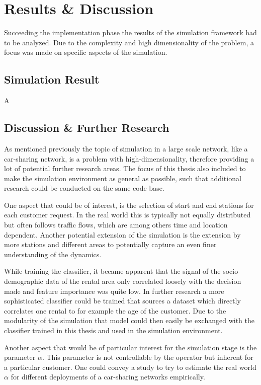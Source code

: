 \clearpage
\section{Results \& Discussion}
\label{sec:Results}


Succeeding the implementation phase the results of the simulation framework had to be analyzed. Due
to the complexity and high dimensionality of the problem, a focus was made on specific aspects of
the simulation. 

\subsection{Simulation Result}
\label{sub_sec:Results/Results}

A

\subsection{Discussion \& Further Research}
\label{sub_sec:Results/Discussion}

As mentioned previously the topic of simulation in a large scale network, like a car-sharing network,
is a problem with high-dimensionality, therefore providing a lot of potential further research areas.
The focus of this thesis also included to make the simulation environment as general 
as possible, such that additional research could be conducted on the same code base.

One aspect that could be of interest, is the selection of start and end stations for
each customer request. In the real world this is typically not equally distributed but
often follows traffic flows, which are among others time and location dependent.
Another potential extension of the simulation is the extension by more stations and different
areas to potentially capture an even finer understanding of the dynamics.

While training the classifier, it became apparent that the signal of the socio-demographic
data of the rental area only correlated loosely with the decision made and feature importance
was quite low. In further research a more sophisticated classifier could be trained that
sources a dataset which directly correlates one rental to for example the age of the
customer. Due to the modularity of the simulation that model could then easily be
exchanged with the classifier trained in this thesis and used in the simulation 
environment. 

Another aspect that would be of particular interest for the simulation stage is the parameter
$\alpha$. This parameter is not controllable by the operator but inherent for a particular
customer. One could convey a study to try to estimate the real world $\alpha$ for different
deployments of a car-sharing networks empirically.
